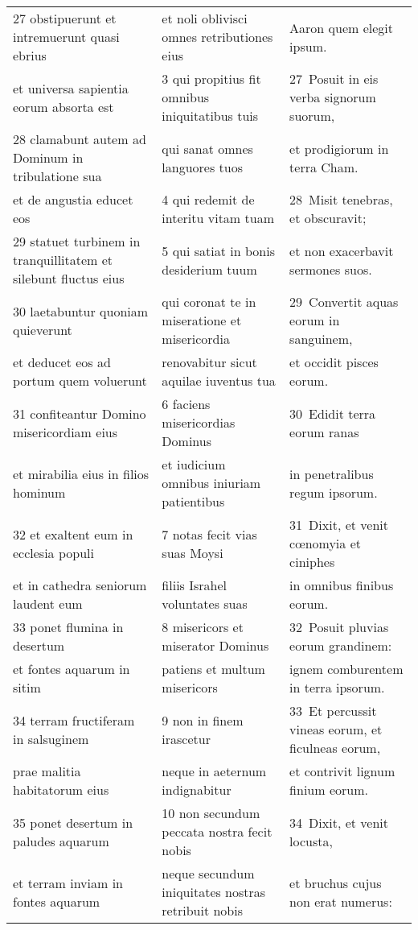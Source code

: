 \documentclass{article}
\begin{document}
\begin{longtable}{@{}p{}p{}p{}@{}}
27 obstipuerunt et intremuerunt quasi ebrius	&	et noli oblivisci omnes retributiones eius	&	Aaron quem elegit ipsum.	\\
et universa sapientia eorum absorta est	&	3 qui propitius fit omnibus iniquitatibus tuis	&	27 Posuit in eis verba signorum suorum,	\\
28 clamabunt autem ad Dominum in tribulatione sua	&	qui sanat omnes languores tuos	&	et prodigiorum in terra Cham.	\\
et de angustia educet eos	&	4 qui redemit de interitu vitam tuam	&	28 Misit tenebras, et obscuravit;	\\
29 statuet turbinem in tranquillitatem et silebunt fluctus eius	&	5 qui satiat in bonis desiderium tuum	&	et non exacerbavit sermones suos.	\\
30 laetabuntur quoniam quieverunt	&	qui coronat te in miseratione et misericordia	&	29 Convertit aquas eorum in sanguinem,	\\
et deducet eos ad portum quem voluerunt	&	renovabitur sicut aquilae iuventus tua	&	et occidit pisces eorum.	\\
31 confiteantur Domino misericordiam eius	&	6 faciens misericordias Dominus	&	30 Edidit terra eorum ranas	\\
et mirabilia eius in filios hominum	&	et iudicium omnibus iniuriam patientibus	&	in penetralibus regum ipsorum.	\\
32 et exaltent eum in ecclesia populi	&	7 notas fecit vias suas Moysi	&	31 Dixit, et venit cœnomyia et ciniphes	\\
et in cathedra seniorum laudent eum	&	filiis Israhel voluntates suas	&	in omnibus finibus eorum.	\\
33 ponet flumina in desertum	&	8 misericors et miserator Dominus	&	32 Posuit pluvias eorum grandinem:	\\
et fontes aquarum in sitim	&	patiens et multum misericors	&	ignem comburentem in terra ipsorum.	\\
34 terram fructiferam in salsuginem	&	9 non in finem irascetur	&	33 Et percussit vineas eorum, et ficulneas eorum,	\\
prae malitia habitatorum eius	&	neque in aeternum indignabitur	&	et contrivit lignum finium eorum.	\\
35 ponet desertum in paludes aquarum	&	10 non secundum peccata nostra fecit nobis	&	34 Dixit, et venit locusta,	\\
et terram inviam in fontes aquarum	&	neque secundum iniquitates nostras retribuit nobis	&	et bruchus cujus non erat numerus:	\\

\end{longtable}
\end{document}
